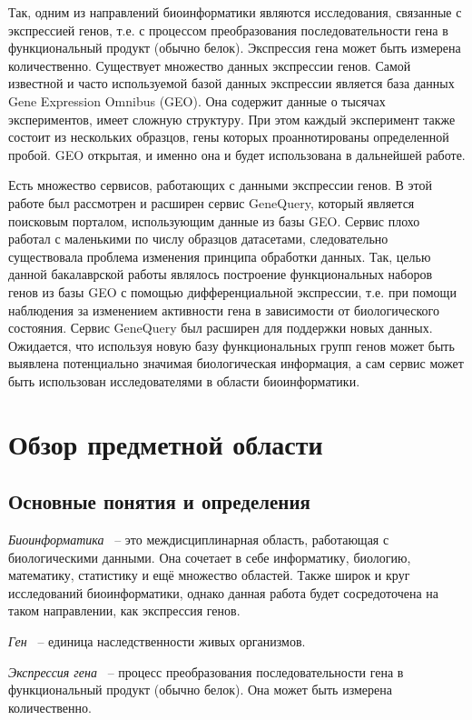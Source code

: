 \documentclass[times,specification,annotation]{itmo-student-thesis}
\begin{document}
Так, одним из направлений биоинформатики являются исследования, связанные с экспрессией генов, т.е. с процессом преобразования последовательности гена в функциональный продукт (обычно белок). Экспрессия гена может быть измерена количественно. Существует множество данных экспрессии генов. Самой известной и часто используемой базой данных экспрессии является база данных ​Gene Expression Omnibus (GEO). Она содержит данные о тысячах экспериментов, имеет сложную структуру. При этом каждый эксперимент также состоит из нескольких образцов, гены которых проаннотированы определенной пробой. GEO открытая, и именно она и будет использована в дальнейшей работе. 

Есть множество сервисов, работающих с данными экспрессии генов. В этой работе был рассмотрен и расширен сервис GeneQuery, который является поисковым порталом, использующим данные из базы GEO. Сервис плохо работал с маленькими по числу образцов датасетами, следовательно существовала проблема изменения принципа обработки данных. Так, целью данной бакалаврской работы являлось построение функциональных наборов генов из базы GEO с помощью дифференциальной экспрессии, т.е. при помощи наблюдения за изменением активности гена в зависимости от биологического состояния. Сервис GeneQuery был расширен для поддержки новых данных. Ожидается, что используя новую базу функциональных групп генов может быть выявлена потенциально значимая биологическая информация, а сам сервис может быть использован исследователями в области биоинформатики.        

\chapter{Обзор предметной области}

\section{Основные понятия и определения}
\startrelatedwork
\textit{Биоинформатика} ~-- это междисциплинарная область, работающая с биологическими данными. Она сочетает в себе информатику, биологию, математику, статистику и ещё множество областей. Также широк и круг исследований биоинформатики, однако данная работа будет сосредоточена на таком направлении, как экспрессия генов.

\textit{Ген} ~-- единица наследственности живых организмов.

\textit{Экспрессия гена} ~-- процесс преобразования последовательности гена в функциональный продукт (обычно белок). Она может быть измерена количественно. 
\end{document}
